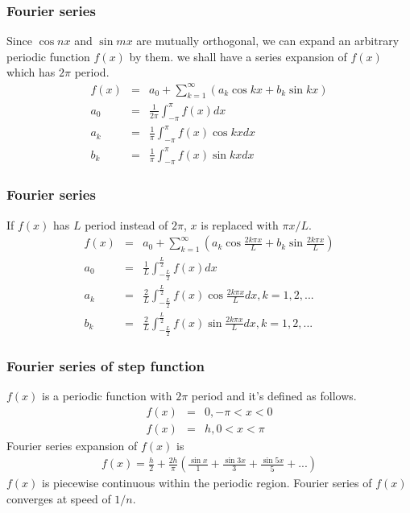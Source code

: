 \documentclass{beamer}
\begin{document}
\begin{frame}
\frametitle{Fourier series}
Since $\cos nx $ and $\sin mx$ are mutually orthogonal, we can expand an arbitrary periodic function $f(x)$ by them. we shall have a series expansion of $f(x)$ which has $2\pi$ period.
\begin{eqnarray}
f(x)&=&a_0 + \sum_{k=1}^{\infty} \left(a_k\cos kx + b_k \sin kx\right) \nonumber \\
a_0&=&\frac{1}{2\pi}\int_{-\pi}^{\pi}f(x) dx \nonumber \\
a_k&=&\frac{1}{\pi}\int_{-\pi}^{\pi}f(x) \cos kx dx \nonumber \\
b_k&=&\frac{1}{\pi}\int_{-\pi}^{\pi}f(x) \sin kx dx
\label{eq:fseries}
\end{eqnarray}
\end{frame}
\begin{frame}
\frametitle{Fourier series}
If $f(x)$ has $L$ period instead of $2\pi$, $x$ is replaced with $\pi x /L$.
\begin{eqnarray}
f(x)&=&a_0 + \sum_{k=1}^{\infty} \left(a_k\cos \frac{2k\pi x}{L} + b_k \sin \frac{2k\pi x}{L}\right) \nonumber \\
a_0&=&\frac{1}{L}\int_{-\frac{L}{2}}^{\frac{L}{2}}f(x) dx \nonumber \\
a_k&=&\frac{2}{L}\int_{-\frac{L}{2}}^{\frac{L}{2}}f(x) \cos \frac{2k\pi x}{L} dx, k = 1,2,...\nonumber \\
b_k&=&\frac{2}{L}\int_{-\frac{L}{2}}^{\frac{L}{2}}f(x) \sin \frac{2k\pi x}{L} dx, k = 1,2,...
\label{eq:fseries_pL}
\end{eqnarray}
\end{frame}
\begin{frame}
\frametitle{Fourier series of step function}
$f(x)$ is a periodic function with $2\pi$ period and it's defined as follows.
\begin{eqnarray}
f(x)&=& 0, -\pi < x < 0 \nonumber \\
f(x)&=& h, 0 < x < \pi
\label{eq:stepfunc}
\end{eqnarray}
Fourier series expansion of $f(x)$ is
\begin{eqnarray}
f(x)= \frac{h}{2} + \frac{2h}{\pi} \left( \frac{\sin x}{1} + \frac{\sin 3x}{3} + \frac{\sin 5x}{5} + ...\right)
\label{eq:stepfunc_ft}
\end{eqnarray}
$f(x)$ is piecewise continuous within the periodic region. Fourier series of $f(x)$ converges at speed of $1/n$.
\end{frame}
\end{document}
